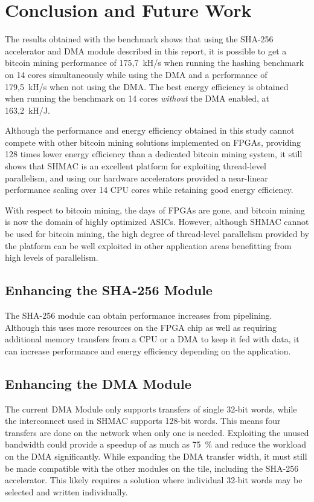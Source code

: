 \chapter{Conclusion and Future Work}
\label{cha:conclusion}

The results obtained with the benchmark shows that using the SHA-256 accelerator and DMA
module described in this report, it is possible to get a bitcoin mining performance of 175,7~kH/s when running the
hashing benchmark on 14 cores simultaneously while using the DMA and a performance of 179,5~kH/s when
not using the DMA. The best energy efficiency is obtained when running the benchmark on 14 cores
\emph{without} the DMA enabled, at 163,2~kH/J.

Although the performance and energy efficiency obtained in this study cannot compete
with other bitcoin mining solutions implemented on FPGAs, providing 128 times lower energy efficiency than
a dedicated bitcoin mining system, it still shows that SHMAC is an excellent platform
for exploiting thread-level parallelism, and using our hardware accelerators provided a
near-linear performance scaling over 14 CPU cores while retaining good energy efficiency.

With respect to bitcoin mining, the days of FPGAs are gone, and bitcoin mining is now
the domain of highly optimized ASICs. However, although SHMAC cannot be used for bitcoin
mining, the high degree of thread-level parallelism provided by the platform can be well exploited
in other application areas benefitting from high levels of parallelism.

\section{Enhancing the SHA-256 Module}

The SHA-256 module can obtain performance increases from pipelining. Although this uses more
resources on the FPGA chip as well as requiring additional memory transfers from a CPU or a
DMA to keep it fed with data, it can increase performance and energy efficiency depending
on the application.

\section{Enhancing the DMA Module}

The current DMA Module only supports transfers of single 32-bit words, while the interconnect used in SHMAC supports 128-bit words.
This means four transfers are done on the network when only one is needed. Exploiting the unused bandwidth could
provide a speedup of as much as 75~\% and reduce the workload on the DMA significantly.
While expanding the DMA transfer width, it must still be made compatible with the other modules on the tile, including the SHA-256 accelerator.
This likely requires a solution where individual 32-bit words may be selected and written individually.


